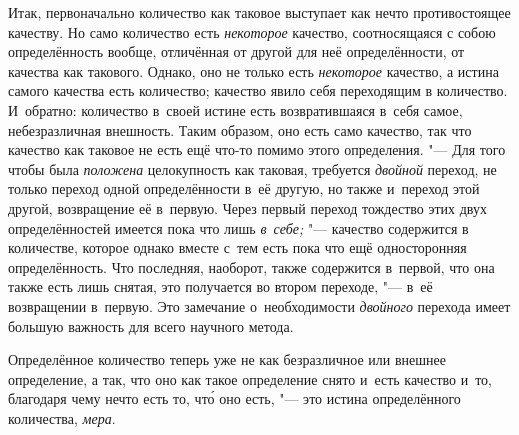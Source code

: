 Итак, первоначально количество как таковое выступает как нечто противостоящее
качеству. Но само количество есть {\em некоторое} качество, соотносящаяся
с собою определённость вообще, отличённая от другой для неё определённости,
от качества как такового. Однако, оно не только есть {\em некоторое} качество,
а истина самого качества есть количество; качество явило себя переходящим
в количество. И~обратно: количество в~своей истине есть возвратившаяся в~себя
самое, небезразличная внешность. Таким образом, оно есть само качество, так что
качество как таковое не есть ещё что-то помимо этого определения. "--- Для того
чтобы была {\em положена} целокупность как таковая, требуется {\em двойной}
переход, не только переход одной определённости в~её другую, но также и~переход
этой другой, возвращение её в~первую. Через первый переход тождество этих двух
определённостей имеется пока что лишь {\em в~себе;} "--- качество содержится
в количестве, которое однако вместе с~тем есть пока что ещё односторонняя
определённость. Что последняя, наоборот, также содержится в~первой, что она
также есть лишь снятая, это получается во втором переходе, "--- в~её
возвращении в~первую. Это замечание о~необходимости {\em двойного} перехода
имеет большую важность для всего научного метода.

Определённое количество теперь уже не как безразличное или внешнее определение,
а так, что оно как такое определение снято и~есть качество и~то, благодаря чему
нечто есть то, чт\'{о} оно есть, "--- это истина определённого количества,
{\em мера}.

\subremark{}

